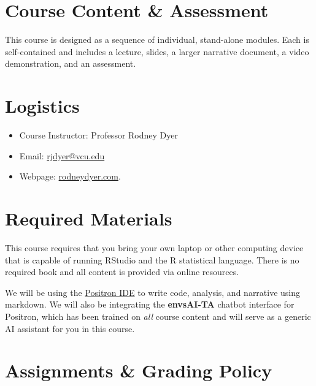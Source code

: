\documentclass[
  letterpaper,
]{book}
\providecommand{\tightlist}{%
  \setlength{\itemsep}{0pt}\setlength{\parskip}{0pt}}
\begin{document}
\section*{Course Content \& Assessment}\label{course-content-assessment}


This course is designed as a sequence of individual, stand-alone
modules. Each is self-contained and includes a lecture, slides, a larger
narrative document, a video demonstration, and an assessment.

\section*{Logistics}\label{logistics-1}


\begin{itemize}
\tightlist
\item
  Course Instructor: Professor Rodney Dyer
\item
  Email: \href{mailto://rjdyer@vcu.edu}{rjdyer@vcu.edu}
\item
  Webpage: \href{https://rodneydyer.com}{rodneydyer.com}.
\end{itemize}

\section*{Required Materials}\label{required-materials}


This course requires that you bring your own laptop or other computing
device that is capable of running RStudio and the R statistical
language. There is no required book and all content is provided via
online resources.

We will be using the \href{https://positron.posit.co/}{Positron IDE} to
write code, analysis, and narrative using markdown. We will also be
integrating the \textbf{envsAI-TA} chatbot interface for Positron, which
has been trained on \emph{all} course content and will serve as a
generic AI assistant for you in this course.

\section*{Assignments \& Grading
Policy}\label{assignments-grading-policy}
\end{document}

